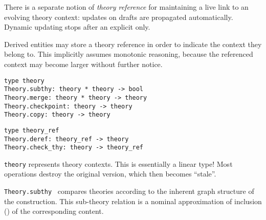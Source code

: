 \begin{isabellebody}
\begin{isamarkuptext}
  \medskip There is a separate notion of \emph{theory reference} for
  maintaining a live link to an evolving theory context: updates on
  drafts are propagated automatically.  Dynamic updating stops after
  an explicit  only.

  Derived entities may store a theory reference in order to indicate
  the context they belong to.  This implicitly assumes monotonic
  reasoning, because the referenced context may become larger without
  further notice.%
\end{isamarkuptext}%
\isamarkuptrue%
%
\isadelimmlref
%
\endisadelimmlref
%
\isatagmlref
%
\begin{isamarkuptext}%
\begin{mldecls}
  \verb|type theory| \\
  \verb|Theory.subthy: theory * theory -> bool| \\
  \verb|Theory.merge: theory * theory -> theory| \\
  \verb|Theory.checkpoint: theory -> theory| \\
  \verb|Theory.copy: theory -> theory| \\
  \end{mldecls}
  \begin{mldecls}
  \verb|type theory_ref| \\
  \verb|Theory.deref: theory_ref -> theory| \\
  \verb|Theory.check_thy: theory -> theory_ref| \\
  \end{mldecls}

  \begin{description}

  \item \verb|theory| represents theory contexts.  This is
  essentially a linear type!  Most operations destroy the original
  version, which then becomes ``stale''.

  \item \verb|Theory.subthy|~
  compares theories according to the inherent graph structure of the
  construction.  This sub-theory relation is a nominal approximation
  of inclusion (\isa{{\isasymsubseteq}}) of the corresponding content.


\end{description}
\end{isamarkuptext}
\end{isabellebody}
